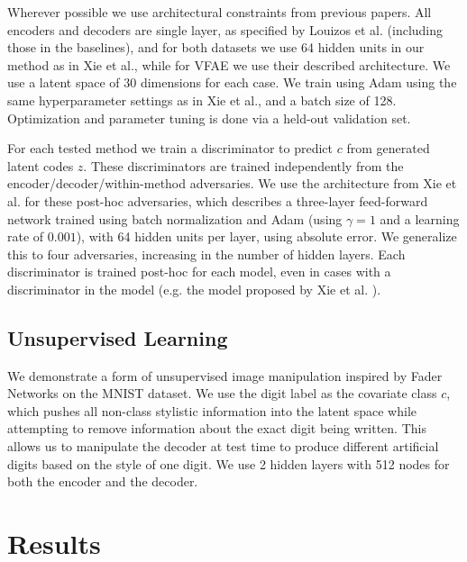 Wherever possible we use architectural constraints from previous papers. All encoders and decoders are single layer, as specified by  Louizos et al. \cite{louizos2015variational} (including those in the baselines), and for both datasets we use 64 hidden units in our method as in Xie et al., while for VFAE we use their described architecture. We use a latent space of 30 dimensions for each case. We train using Adam using the same hyperparameter settings as in Xie et al., and a batch size of 128. Optimization and parameter tuning is done via a held-out validation set.

For each tested method we train a discriminator to predict $c$ from generated latent codes $z$. These discriminators are trained independently from the encoder/decoder/within-method adversaries. We use the architecture from Xie et al. \cite{xie2017controllable} for these post-hoc adversaries, which describes a three-layer feed-forward network trained using batch normalization and Adam (using $\gamma = 1$ and a learning rate of $0.001$), with 64 hidden units per layer, using absolute error. We generalize this to four adversaries, increasing in the number of hidden layers. Each discriminator is trained post-hoc for each model, even in cases with a discriminator in the model (e.g. the model proposed by Xie et al. \cite{xie2017controllable}).

\subsection{Unsupervised Learning}

We demonstrate a form of unsupervised image manipulation inspired by Fader Networks \cite{lample2017fader} on the MNIST dataset. We use the digit label as the covariate class $c$, which pushes all non-class stylistic information into the latent space while attempting to remove information about the exact digit being written. This allows us to manipulate the decoder at test time to produce different artificial digits based on the style of one digit. We use 2 hidden layers with 512 nodes for both the encoder and the decoder.

\section{Results}


